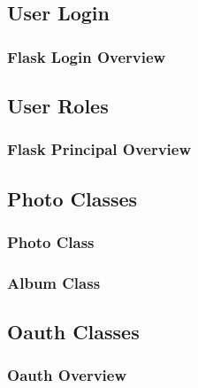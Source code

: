 \documentclass{article}
\begin{document}
\subsection{User Login}

\subsubsection{Flask Login Overview}

\subsection{User Roles}

\subsubsection{Flask Principal Overview}

\subsection{Photo Classes}

\subsubsection{Photo Class}

\subsubsection{Album Class}

\subsection{Oauth Classes}

\subsubsection{Oauth Overview}

\newpage


\end{document}
